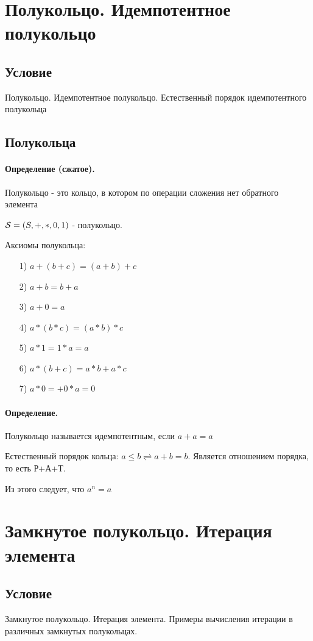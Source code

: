 \documentclass{report}
\begin{document}
\section{Полукольцо. Идемпотентное полукольцо}
\subsection{Условие}
Полукольцо. Идемпотентное полукольцо. Естественный порядок идемпотентного
полукольца

\subsection{Полукольца}
\paragraph*{Определение (сжатое).} Полукольцо - это кольцо, в котором по операции сложения нет обратного элемента

${\cal S} = (S, +, *, 0, 1)$ - полукольцо.

\medskip

Аксиомы полукольца:
\begin{itemize}
    \item[1)] $a + (b + c) = (a + b) + c$
    \item[2)] $a + b = b + a$
    \item[3)] $a + 0 = a$
    \item[4)] $a*(b*c) = (a*b)*c$
    \item[5)] $a*1=1*a=a$
    \item[6)] $a*(b+c)=a*b+a*c$
    \item[7)] $a*0 = +0*a=0$
\end{itemize}

\paragraph*{Определение.}
Полукольцо называется идемпотентным, если $a + a = a$

Естественный порядок кольца: $a \leq b \rightleftharpoons a + b = b$. Является отношением порядка, то есть Р+А+Т.

Из этого следует, что $a^n = a$

\newpage

\section{Замкнутое полукольцо. Итерация элемента}
\subsection{Условие}
Замкнутое полукольцо. Итерация элемента. Примеры вычисления итерации в
различных замкнутых полукольцах.
\end{document}
